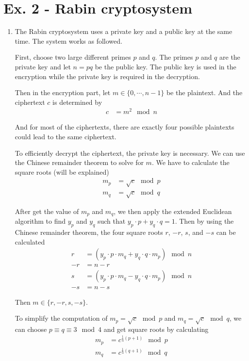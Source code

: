 \documentclass[11pt,a4paper]{article}
\begin{document}
\section*{Ex. 2 - Rabin cryptosystem}
\begin{enumerate}
	\item The Rabin cryptosystem uses a private key and a public key at the same time. The system works as followed.
	\par First, choose two large different primes $p$ and $q$. The primes $p$ and $q$ are the private key and let $n = pq$ be the public key. The public key is used in the encryption while the private key is required in the decryption.
	\par Then in the encryption part, let $m \in \{ 0, \cdots, n-1 \}$ be the plaintext. And the ciphertext $c$ is determined by
		\begin{align*}
			c &= m^{2} \mod n
		\end{align*}
	\par And for most of the ciphertexts, there are exactly four possible plaintexts could lead to the same ciphertext.
	\par To efficiently decrypt the ciphertext, the private key is necessary. We can use the Chinese remainder theorem to solve for $m$. We have to calculate the square roots (will be explained)
		\begin{align*}
			m_{p} &= \sqrt{c} \mod p \\
			m_{q} &= \sqrt{c} \mod q
		\end{align*}
	\par After get the value of $m_{p}$ and $m_{q}$, we then apply the extended Euclidean algorithm to find $y_{p}$ and $y_{q}$ such that $y_{p}\cdot p + y_{q}\cdot q = 1$. Then by using the Chinese remainder theorem, the four square roots $r$, $-r$, $s$, and $-s$ can be calculated
        \begin{align*}
            r &= (y_{p} \cdot p \cdot m_{q} + y_{q} \cdot q \cdot m_{p}) \mod n \\
            -r &= n - r \\
            s &= (y_{p} \cdot p \cdot m_{q} - y_{q} \cdot q \cdot m_{p}) \mod n \\
            -s &= n - s
        \end{align*}
    \par Then $m \in \{ r, -r, s, -s \}$.
    \par To simplify the computation of $m_{p} = \sqrt{c} \mod p$ and $m_{q} = \sqrt{c} \mod q$, we can choose $p \equiv q \equiv 3 \mod 4$ and get square roots by calculating
        \begin{align*}
            m_{p} &= c^{\frac{1}{4}(p+1)} \mod p \\
            m_{q} &= c^{\frac{1}{4}(q+1)} \mod q
        \end{align*}


\end{enumerate}
\end{document}
